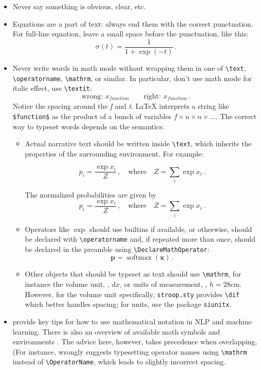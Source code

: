 \begin{itemize}
\item Never say something is obvious, clear, etc.
\item Equations are a part of text: always end them with the correct
punctuation. For full-line equation, leave a small space before the
punctuation, like this:
\[ \sigma(t) = \frac{1}{1+\exp(-t)}\,. \]
\item Never write words in math mode without wrapping them in one of
\verb|\text|,
\verb|\operatorname|,
\verb|\mathrm|,
or similar.
In particular, don't use math mode for
italic effect, use \verb|\textit|:
\[ \text{wrong: } x_{function} \qquad \text{right: } x_\textit{function}\,. \]
Notice the spacing around the \emph{f} and \emph{t}.
\LaTeX{} interprets a string like \verb|$function$| as the product of
a bunch of variables $f \times u \times n \times \ldots$.
The correct way to typeset words depends on the semantics:
\begin{itemize}
\item Actual narrative text should be written inside \verb|\text|,
which inherits the properties of the surrounding environment. For example:

\[ p_i = \frac{\exp x_i}{Z}\,,
\quad \text{where} \quad
Z=\sum_i \exp x_i\,.\]

\begin{theorem}
The normalized probabilities are given by
\[ p_i = \frac{\exp x_i}{Z}\,,
\quad \text{where} \quad
Z=\sum_i \exp x_i\,.\]
\end{theorem}
\item Operators like $\exp$ should use builtins if available, or
otherwise, should be declared with \verb|\operatorname| and,
if repeated more than once, should be declared in the preamble using
\verb|\DeclareMathOperator|:
\[\bm{p} = \operatorname{softmax}(\bm{x})\,.\]
\item Other objects that should be typeset as text should use \verb|\mathrm|,
for instance the volume unit, \eg, $\mathrm{d}x$,
or units of measurement, \eg, $h=28\mathrm{cm}$.
However, for the volume unit specifically, \verb|stroop.sty|
provides \verb|\dif| which better handles spacing;
for units, use the package \verb|siunitx|.
\end{itemize}

\item {} provide key tips for how to use mathematical notation
in NLP and machine learning.
There is also an overview of available math symbols and environments  \citep{downes-17}.
The advice here, however, takes precedence when overlapping. (For instance,
\citet{typesetting-math} wrongly suggests typesetting operator names using \verb|\mathrm| instead of \verb|\OperatorName|,
which leads to slightly incorrect spacing.
\end{itemize}

